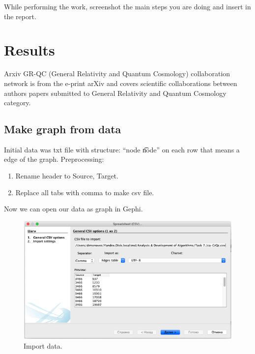 \documentclass[a4paper,article,14pt]{extarticle}
\begin{document}
	While performing the work, screenshot the main steps you are doing and insert in the report.
	
	\section{Results}
	
	Arxiv GR-QC (General Relativity and Quantum Cosmology) collaboration network is from the e-print arXiv and covers scientific collaborations between authors papers submitted to General Relativity and Quantum Cosmology category.
	
	\subsection{Make graph from data}
	
	Initial data was txt file with structure: “node \t node” on each row that means a edge of the graph. Preprocessing:
	\begin{enumerate}
		\item Rename header to Source, Target.
		\item Replace all tabs with comma to make csv file.
	\end{enumerate}

	Now we can open our data as graph in Gephi.

	\begin{figure}[h!]
		\centering
		\includegraphics[scale=0.5]{import.png}
		\caption{Import data.}
		\label{graph}
	\end{figure}
\end{document}
